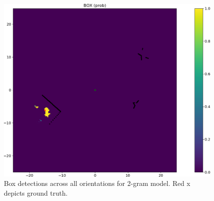 %
\begin{figure}
  \centering
  \includegraphics[width=\columnwidth]{figures/box_2gram.png}
  \caption{Box detections across all orientations for 2-gram model. Red x
    depicts ground truth.}
  \label{fig:box_2gram}
\end{figure}
